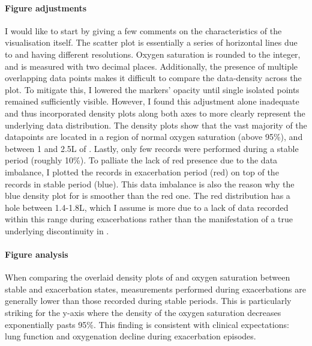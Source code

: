 \paragraph{Figure adjustments}
I would like to start by giving a few comments on the characteristics of the visualisation itself. The scatter plot is essentially a series of horizontal lines due to \SP and \F having different resolutions. Oxygen saturation is rounded to the integer, and \F is measured with two decimal places. Additionally, the presence of multiple overlapping data points makes it difficult to compare the data-density across the plot. To mitigate this, I lowered the markers' opacity until single isolated points remained sufficiently visible. However, I found this adjustment alone inadequate and thus incorporated density plots along both axes to more clearly represent the underlying data distribution. The density plots show that the vast majority of the datapoints are located in a region of normal oxygen saturation (above 95\%), and between 1 and 2.5L of \F. Lastly, only few records were performed during a stable period (roughly 10\%). To palliate the lack of red presence due to the data imbalance, I plotted the records in exacerbation period (red) on top of the records in stable period (blue). This data imbalance is also the reason why the blue density plot for \F is smoother than the red one. The red distribution has a hole between 1.4-1.8L, which I assume is more due to a lack of data recorded within this range during exacerbations rather than the manifestation of a true underlying discontinuity in \F.

\paragraph{Figure analysis}
When comparing the overlaid density plots of \F and oxygen saturation between stable and exacerbation states, measurements performed during exacerbations are generally lower than those recorded during stable periods. This is particularly striking for the y-axis where the density of the oxygen saturation decreases exponentially pasts 95\%. This finding is consistent with clinical expectations: lung function and oxygenation decline during exacerbation episodes.

